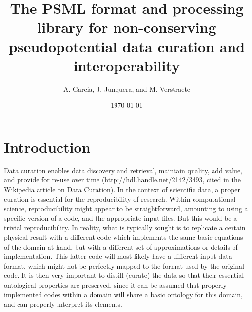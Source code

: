 \documentclass[prb,showpacs,superscriptaddress]{revtex4-1}
\begin{document}
\title {The PSML format and processing library for non-conserving pseudopotential
        data curation and interoperability}

\author{A. Garcia, J. Junquera, and M. Verstraete}
\date{\today}
\maketitle

\section{Introduction}

Data curation enables data discovery and retrieval, maintain
quality, add value, and provide for re-use over time
(\url{http://hdl.handle.net/2142/3493}, cited in the Wikipedia article on
Data Curation). 
%
In the context of scientific
data, a proper curation is essential for the reproducibility of
research.
%
Within computational science, reproducibility might appear to be
straightforward, amounting to 
using a specific version of a code, and the appropriate
input files. But this would be a trivial reproducibility. In reality,
what is typically sought is to replicate a certain physical result
with a different code which implements the same basic equations of the
domain at hand, but with a different set of approximations or details
of implementation. This latter code will most likely have a different input
data format, which might not be perfectly mapped to the format
used by the original code. It is then very important to distill
(curate) the data so that their essential ontological properties are
preserved, since it can be assumed that properly implemented codes
within a domain will share a basic ontology for this domain, and can
properly interpret its elements.
\end{document}
